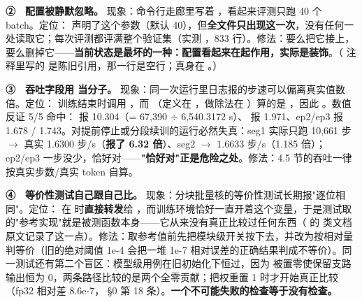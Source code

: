\documentclass[11pt,openany]{ctexart}
\begin{document}
\textbf{②　配置被静默忽略。} 现象：命令行走廊里写着 ，看起来评测只跑 40 个 batch。定位： 声明了这个参数（默认 40），但\textbf{全文件只出现这一次}，没有任何一处读取它；每次评测都评满整个验证集（实测 ，833 行）。修法：要么把它接上，要么删掉它——\textbf{当前状态是最坏的一种：配置看起来在起作用，实际是装饰}。（ 注释里写的  是陈旧引用，那一行是空行；真身在 。）

\textbf{③　吞吐字段用  当分子。} 现象：同一次运行里日志报的步速可以偏离真实值数倍。定位： 训练结束时调用 ，而 （定义在 ，做除法在 ）算的是 ，因此 \textbf{}。数值反证 5/5 命中： 报 10.304（= 67,390 $\div$ 6,540.3172 s）、 报 1.971、ep2/ep3 报 1.678 / 1.743。对提前停止或分段续训的运行必然失真：seg1 实际只跑 10,661 步 $\rightarrow$ 真实 1.6300 步/s（\textbf{报了 6.32 倍}）、seg2 $\rightarrow$ 1.6633 步/s（1.185 倍）；ep2/ep3 一步没少，恰好对——\textbf{"恰好对"正是危险之处}。修法：4.5 节的吞吐一律按真实步数/真实 token 自算。

\textbf{④　等价性测试自己跟自己比。} 现象：分块批量核的等价性测试长期报"逐位相同"。定位： 在  时\textbf{直接转发}给 ，而训练环境恰好一直开着这个变量，于是测试取的"参考实现"就是被测函数本身——它从来没有真正比较过任何东西（ 的  类文档原文记录了这一点）。修法：取参考值前先把模块级开关按下去，并改为按相对量判等价（旧的绝对阈值 1e-4 会把一堆 1e-7 相对误差的正确结果判成不等价）。同一测试还有第二个盲区：模型级用例在旧初始化下恒过，因为  被置零使保留支路输出恒为 0，两条路径比较的是两个全零贡献；把权重置 1 时才开始真正比较（fp32 相对差 8.6e-7， §0 第 18 条）。\textbf{一个不可能失败的检查等于没有检查。}
\end{document}
